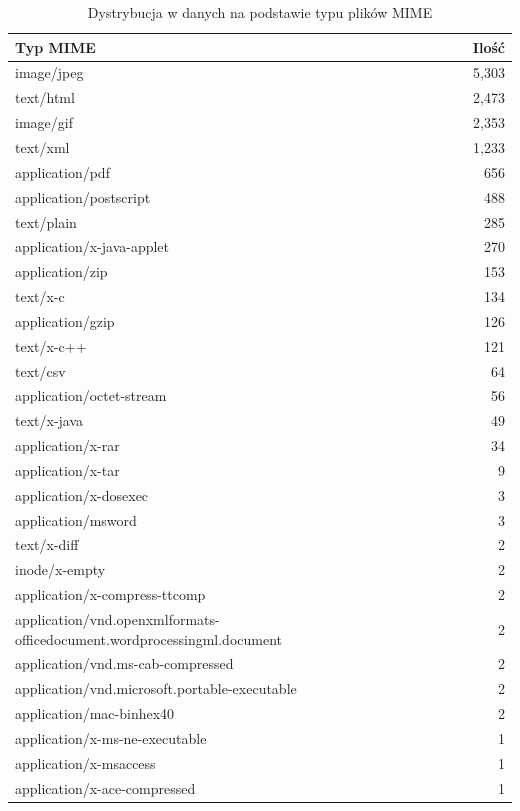 \begin{table}[h]
    \centering
    \begin{tabular}{lr}
        \hline
        \textbf{Typ MIME} & \textbf{Ilość} \\
        \hline
        image/jpeg & 5,303 \\
        text/html & 2,473 \\
        image/gif & 2,353 \\
        text/xml & 1,233 \\
        application/pdf & 656 \\
        application/postscript & 488 \\
        text/plain & 285 \\
        application/x-java-applet & 270 \\
        application/zip & 153 \\
        text/x-c & 134 \\
        application/gzip & 126 \\
        text/x-c++ & 121 \\
        text/csv & 64 \\
        application/octet-stream & 56 \\
        text/x-java & 49 \\
        application/x-rar & 34 \\
        application/x-tar & 9 \\
        application/x-dosexec & 3 \\
        application/msword & 3 \\
        text/x-diff & 2 \\
        inode/x-empty & 2 \\
        application/x-compress-ttcomp & 2 \\
        application/vnd.openxmlformats-officedocument.wordprocessingml.document & 2 \\
        application/vnd.ms-cab-compressed & 2 \\
        application/vnd.microsoft.portable-executable & 2 \\
        application/mac-binhex40 & 2 \\
        application/x-ms-ne-executable & 1 \\
        application/x-msaccess & 1 \\
        application/x-ace-compressed & 1 \\
        \hline
    \end{tabular}
    \caption{Dystrybucja w danych na podstawie typu plików MIME}
    \label{tabela:typyMIMEdataset}
\end{table}

